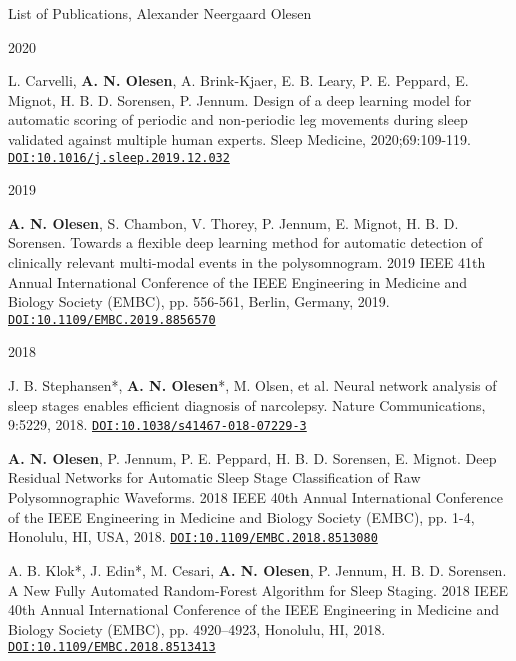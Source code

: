 \documentclass{resume} %
\begin{document}
\begin{rSection}{List of Publications, Alexander Neergaard Olesen}
\begin{rSubsection}{2020}{}{}{}
	    \item L. Carvelli, \textbf{A. N. Olesen}, A. Brink-Kjaer, E. B. Leary, P. E. Peppard, E. Mignot, H. B. D. Sorensen, P. Jennum. Design of a deep learning model for automatic scoring of periodic and non-periodic leg movements during sleep validated against multiple human experts. Sleep Medicine, 2020;69:109-119. \href{https://doi.org/10.1016/j.sleep.2019.12.032}{\texttt{DOI:10.1016/j.sleep.2019.12.032}}
	\end{rSubsection}
    
	\begin{rSubsection}{2019}{}{}{}
	    \item \textbf{A. N. Olesen}, S. Chambon, V. Thorey, P. Jennum, E. Mignot, H. B. D. Sorensen. Towards a flexible deep learning method for automatic detection of clinically relevant multi-modal events in the polysomnogram. 2019 IEEE 41th Annual International Conference of the IEEE Engineering in Medicine and Biology Society (EMBC), pp. 556-561, Berlin, Germany, 2019. \href{https://doi.org/10.1109/EMBC.2019.8856570}{\texttt{DOI:10.1109/EMBC.2019.8856570}}
	\end{rSubsection}
	
	\begin{rSubsection}{2018}{}{}{}
	    \item J. B. Stephansen\mbox{*}, \textbf{A. N. Olesen}\mbox{*}, M. Olsen, et al. Neural network analysis of sleep stages enables efficient diagnosis of narcolepsy. Nature Communications, 9:5229, 2018. \href{https://doi.org/10.1038/s41467-018-07229-3}{\texttt{DOI:10.1038/s41467-018-07229-3}} \medskip
	    
	    \item \textbf{A. N. Olesen}, P. Jennum, P. E. Peppard, H. B. D. Sorensen, E. Mignot. Deep Residual Networks for Automatic Sleep Stage Classification of Raw Polysomnographic Waveforms. 2018 IEEE 40th Annual International Conference of the IEEE Engineering in Medicine and Biology Society (EMBC), pp. 1-4, Honolulu, HI, USA, 2018. \href{https://doi.org/10.1109/EMBC.2018.8513080}{\texttt{DOI:10.1109/EMBC.2018.8513080}}\medskip
	    
	    \item A. B. Klok\mbox{*}, J. Edin\mbox{*}, M. Cesari, \textbf{A. N. Olesen}, P. Jennum, H. B. D. Sorensen. A New Fully Automated Random-Forest Algorithm for Sleep Staging. 2018 IEEE 40th Annual International Conference of the IEEE Engineering in Medicine and Biology Society (EMBC), pp. 4920–4923, Honolulu, HI, 2018. \href{https://doi.org/10.1109/EMBC.2018.8513413}{\texttt{DOI:10.1109/EMBC.2018.8513413}} \medskip
	    

\end{rSubsection}
\end{rSection}
\end{document}
